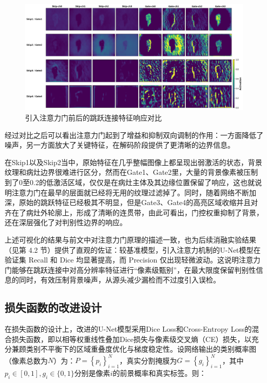 \begin{figure}[!htbp]
    \centering
    \includegraphics[width=\textwidth]{fig/unet_vs_attunet_feature_compare.png}
    \caption{引入注意力门前后的跳跃连接特征响应对比}
    \label{fig:skip_vs_gate_vis}
\end{figure}

经过对比之后可以看出注意力门起到了增益和抑制双向调制的作用：一方面降低了噪声，另一方面放大了关键特征，在解码阶段提供了更清晰的边界信息。

在Skip1以及Skip2当中，原始特征在几乎整幅图像上都呈现出弱激活的状态，背景纹理和病灶边界很难进行区分，然而在Gate1、Gate2里，大量的背景像素被压制到了0至0.2的低激活区域，仅仅是在病灶主体及其边缘位置保留了响应，这也就说明注意力门在最早的层面就已经将无用的纹理过滤掉了。同时，随着网络不断加深，原始的跳跃特征已经极其不明显，但是Gate3、Gate4的高亮区域收缩并且对齐在了病灶外轮廓上，形成了清晰的连贯带，由此可看出，门控权重抑制了背景，还在深层强化了对判别性边界的响应。

上述可视化的结果与前文中对注意力门原理的描述一致，也为后续消融实验结果（见第 4.2 节）提供了直观的佐证：较基准模型，引入注意力机制的U-Net模型在验证集 Recall 和 Dice 均显著提高，而 Precision 仅出现轻微波动。这说明注意力门能够在跳跃连接中对高分辨率特征进行“像素级甄别”，在最大限度保留判别性信息的同时，有效压制背景噪声，从源头减少漏检而不过度引入误检。

\subsection{损失函数的改进设计}

在损失函数的设计上，改进的U-Net模型采用Dice Loss和Cross-Entropy Loss的混合损失函数，即以相等权重线性叠加Dice损失与像素级交叉熵（CE）损失，以充分兼顾类别不平衡下的区域重叠度优化与梯度稳定性。设网络输出的类别概率图（像素总数为$N$）为：$ P=\left\{p_{i}\right\}_{i=1}^{N} $，真实分割掩膜为$ G=\left\{g_{i}\right\}_{i=1}^{N} $，其中$ p_{i} \in[0,1], g_{i} \in\{0,1\}$分别是像素$i$的前景概率和真实标签。则：

